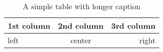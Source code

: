 \begin{table}[H]
\begin{tabular}{l|c|r}
  1st column & 2nd column & 3rd column \\\hline
  left & center & right \\
\end{tabular}
\caption[Simple table]{A simple table with longer caption}
\end{table}